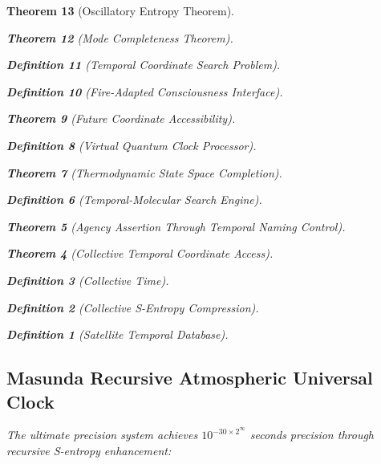 \documentclass[12pt,a4paper]{article}
\newtheorem{theorem}{Theorem}[section]
\newtheorem{definition}[theorem]{Definition}
\begin{document}
\begin{theorem}[Oscillatory Entropy Theorem]
\begin{theorem}[Mode Completeness Theorem]
\begin{enumerate}
\begin{definition}[Temporal Coordinate Search Problem]
\begin{algorithm}
\begin{definition}[Fire-Adapted Consciousness Interface]
\begin{theorem}[Future Coordinate Accessibility]
\begin{definition}[Virtual Quantum Clock Processor]
\begin{itemize}
\begin{itemize}
\begin{theorem}[Thermodynamic State Space Completion]
\begin{definition}[Temporal-Molecular Search Engine]
\begin{theorem}[Agency Assertion Through Temporal Naming Control]
\begin{remark}
\begin{theorem}[Collective Temporal Coordinate Access]
\begin{definition}[Collective Time]
\begin{definition}[Collective S-Entropy Compression]
\begin{definition}[Satellite Temporal Database]
\begin{algorithm}
\begin{table}[h]
{{\subsection{Masunda Recursive Atmospheric Universal Clock}

The ultimate precision system achieves $10^{-30 \times 2^{\infty}}$ seconds precision through recursive S-entropy enhancement:

\begin{figure}[H]
\centering
{}
\end{figure}}}
\end{table}
\end{algorithm}
\end{definition}
\end{definition}
\end{definition}
\end{theorem}
\end{remark}
\end{theorem}
\end{definition}
\end{theorem}
\end{itemize}
\end{itemize}
\end{definition}
\end{theorem}
\end{definition}
\end{algorithm}
\end{definition}
\end{enumerate}
\end{theorem}
\end{theorem}
\end{document}
